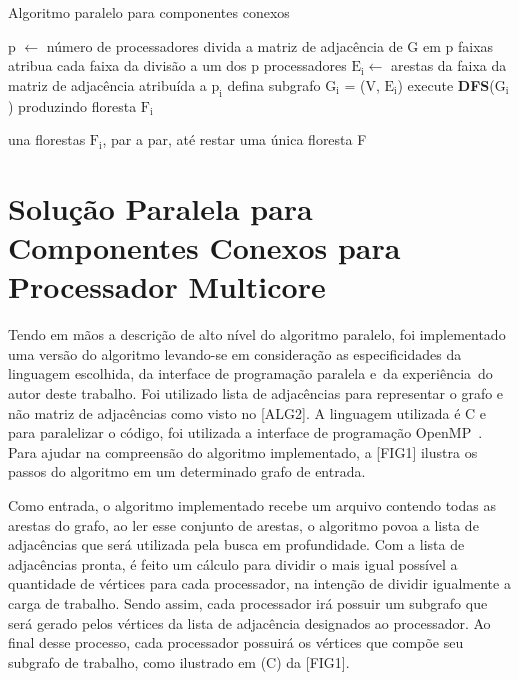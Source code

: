 \documentclass[12pt]{article}
\begin{document}
\begin{algorithm}[htp!]
    \DontPrintSemicolon
    \newcommand\mycommfont[1]{\small\ttfamily{#1}}
    \caption{Algoritmo paralelo para componentes conexos}
    \label{alg_grama}
    {
        p $\gets$ número de processadores\;
        divida a matriz de adjacência de G em p faixas\;
        atribua cada faixa da divisão a um dos p processadores\;
        {
            $\text{E}_\text{i} \gets$ arestas da faixa da matriz de adjacência atribuída a $\text{p}_\text{i}$\;
            defina subgrafo $\text{G}_\text{i}$ = (V, $\text{E}_\text{i}$)\;
            execute \textbf{DFS}($\text{G}_\text{i}$) produzindo floresta $\text{F}_\text{i}$\;
        }

        una florestas $\text{F}_\text{i}$, par a par, até restar uma única floresta F\;
        
    }
\end{algorithm}

\section{Solução Paralela para Componentes Conexos para Processador Multicore}
Tendo em mãos a descrição de alto nível do algoritmo paralelo, foi implementado uma versão do algoritmo levando-se em consideração as especificidades da linguagem escolhida, da interface de programação paralela e da experiência do autor deste trabalho. Foi utilizado lista de adjacências para representar o grafo e não matriz de adjacências como visto no [ALG2]. A linguagem utilizada é C e para paralelizar o código, foi utilizada a interface de programação OpenMP~\cite{OpenMP:2018}. Para ajudar na compreensão do algoritmo implementado, a [FIG1] ilustra os passos do algoritmo em um determinado grafo de entrada.

Como entrada, o algoritmo implementado recebe um arquivo contendo todas as arestas do grafo, ao ler esse conjunto de arestas, o algoritmo povoa a lista de adjacências que será utilizada pela busca em profundidade. Com a lista de adjacências pronta, é feito um cálculo para dividir o mais igual possível a quantidade de vértices para cada processador, na intenção de dividir igualmente a carga de trabalho. Sendo assim, cada processador irá possuir um subgrafo que será gerado pelos vértices da lista de adjacência designados ao processador. Ao final desse processo, cada processador possuirá os vértices que compõe seu subgrafo de trabalho, como ilustrado em (C) da [FIG1].
\end{document}
